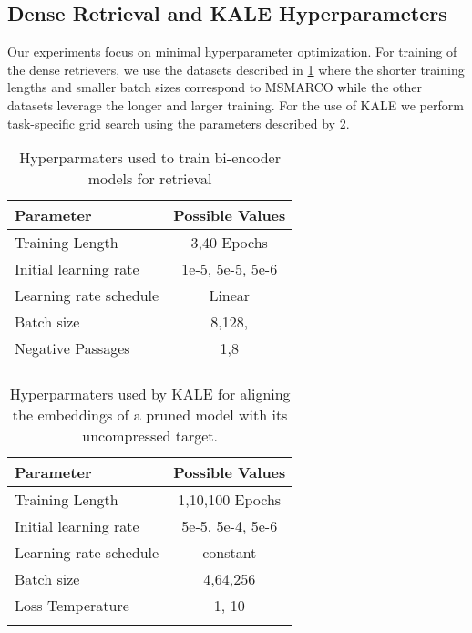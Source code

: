 \subsection{Dense Retrieval and KALE Hyperparameters}
Our experiments focus on minimal hyperparameter optimization. For training of the dense retrievers, we use the datasets described in \ref{tab:hyperparams-kale} where the shorter training lengths and smaller batch sizes correspond to MSMARCO while the other datasets leverage the longer and larger training. For the use of KALE we perform task-specific grid search using the parameters described by \ref{tab:hyperparams-transfer}.
\begin{table}
      \centering
        {\small 
            \begin{tabular}{l|c}
            \toprule
            Parameter & Possible Values \\
            \midrule
            Training Length& 3,40 Epochs \\
            Initial learning rate & 1e-5, 5e-5, 5e-6\\
            Learning rate schedule &  Linear \\
            \greyrule
                Batch size & 8,128, \\
            \greyrule
            \greyrule
                Negative Passages & 1,8 \\
            \greyrule
            \bottomrule
            \end{tabular}
        }
    \caption{Hyperparmaters used to train bi-encoder models for retrieval    \label{tab:hyperparams-kale}}
\end{table}
\begin{table}
      \centering
        {\small 
            \begin{tabular}{l|c}
            \toprule
            Parameter & Possible Values\\
            \midrule
            Training Length & 1,10,100 Epochs  \\
            Initial learning rate & 5e-5, 5e-4, 5e-6\\
            Learning rate schedule &  constant \\
            \greyrule
                Batch size & 4,64,256 \\
            \greyrule
            \greyrule
                Loss Temperature & 1, 10 \\
            \greyrule
            \bottomrule
            \end{tabular}
        }
    \caption{Hyperparmaters used by KALE for aligning the embeddings of a pruned model with its uncompressed target.\label{tab:hyperparams-transfer}}
\end{table}
